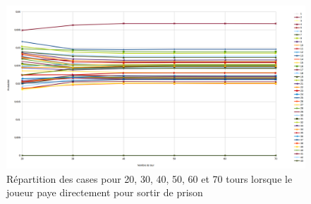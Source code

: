 \documentclass[letterpaper]{article}
\begin{document}
\begin{center}
	  \begin{figure}[h]
	    \includegraphics[scale=0.4]{./Images/GraphRepPaye20-70.png}
	    \caption{\label{graph_all_result_paye} Répartition des cases pour 20, 30, 40, 50, 60 et 70 tours lorsque le joueur paye directement pour sortir de prison}
	  \end{figure}
	  
	\end{center}
	
	
\end{document}
